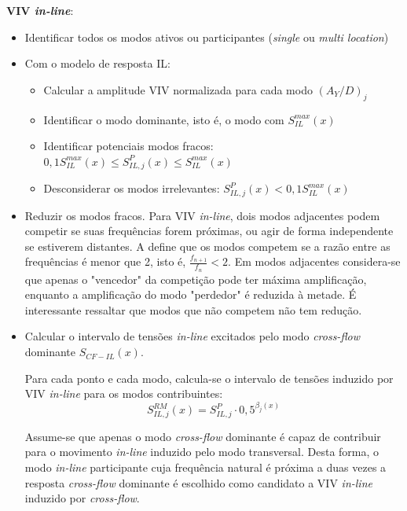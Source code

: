 \textbf{VIV \textit{in-line}}:
\begin{itemize}
\item Identificar todos os modos ativos ou participantes (\textit{single} ou \textit{multi location})
\item Com o modelo de resposta IL:
\begin{itemize}
	\item Calcular a amplitude VIV normalizada para cada modo $(A_Y/D)_j$

	\item Identificar o modo dominante, isto é, o modo com $S_\mathit{IL}^\mathit{max}(x)$

	\item Identificar potenciais modos fracos: $0,1 S_\mathit{IL}^\mathit{max}(x) \leq S_{\mathit{IL}, \mathit{j}}^{P}(x) \leq S_\mathit{IL}^\mathit{max}(x)$

	\item Desconsiderar os modos irrelevantes: $S_{\mathit{IL}, \mathit{j}}^{P}(x) < 0,1 S_\mathit{IL}^\mathit{max}(x)$
\end{itemize}
\item Reduzir os modos fracos.
Para VIV \textit{in-line}, dois modos adjacentes podem competir se suas frequências forem próximas, ou agir de forma independente se estiverem distantes.
A  define que os modos competem se a razão entre as frequências é menor que 2, isto é, $\frac{f_\mathit{n+1}}{f_n} < 2$.
Em modos adjacentes considera-se que apenas o "vencedor" da competição pode ter máxima amplificação, enquanto a amplificação do modo "perdedor" é reduzida à metade. É interessante ressaltar que modos que não competem não tem redução.

\item Calcular o intervalo de tensões \textit{in-line} excitados pelo modo \textit{cross-flow} dominante $S_{\mathit{CF}-\mathit{IL}}(x)$.

Para cada ponto e cada modo, calcula-se o intervalo de tensões induzido por VIV \textit{in-line} para os modos contribuintes:
		\[S_{\mathit{IL}, \mathit{j}}^\mathit{RM}(x) = S_{\mathit{IL}, \mathit{j}}^{P} \cdot 0,5^{\beta_j (x)}\]

Assume-se que apenas o modo \textit{cross-flow} dominante é capaz de contribuir para o movimento \textit{in-line} induzido pelo modo transversal.
Desta forma, o modo \textit{in-line} participante cuja frequência natural é próxima a duas vezes a resposta \textit{cross-flow} dominante é escolhido como candidato a VIV \textit{in-line} induzido por \textit{cross-flow}.


\end{itemize}

